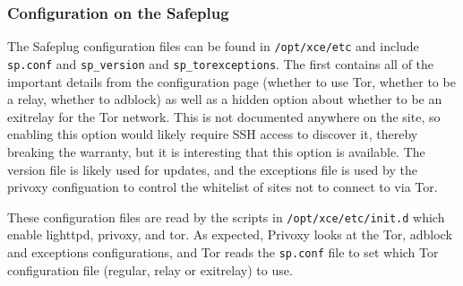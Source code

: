 \subsubsection{Configuration on the Safeplug}
\label{spconfig}
The Safeplug configuration files can be found in \verb!/opt/xce/etc! and include \verb!sp.conf! and \verb!sp_version! and \verb!sp_torexceptions!.  The first contains all of the important details from the configuration page (whether to use Tor, whether to be a relay, whether to adblock) as well as a hidden option about whether to be an exitrelay for the Tor network.  This is not documented anywhere on the site, so enabling this option would likely require SSH access to discover it, thereby breaking the warranty, but it is interesting that this option is available.  The version file is likely used for updates, and the exceptions file is used by the privoxy configuation to control the whitelist of sites not to connect to via Tor.

These configuration files are read by the scripts in \verb!/opt/xce/etc/init.d! which enable lighttpd, privoxy, and tor.  As expected, Privoxy looks at the Tor, adblock and exceptions configurations, and Tor reads the \verb!sp.conf! file to set which Tor configuration file (regular, relay or exitrelay) to use.

